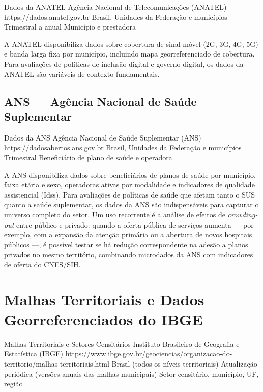 \ficharapida
  {Dados da ANATEL}
  {Agência Nacional de Telecomunicações (ANATEL)}
  {https://dados.anatel.gov.br}
  {Brasil, Unidades da Federação e municípios}
  {Trimestral a anual}
  {Município e prestadora}

A ANATEL disponibiliza dados sobre cobertura de sinal móvel (2G, 3G, 4G, 5G) e banda larga fixa por município, incluindo mapa georreferenciado de cobertura. Para avaliações de políticas de inclusão digital e governo digital, os dados da ANATEL são variáveis de contexto fundamentais.

\subsection{ANS --- Agência Nacional de Saúde Suplementar}

\ficharapida
  {Dados da ANS}
  {Agência Nacional de Saúde Suplementar (ANS)}
  {https://dadosabertos.ans.gov.br}
  {Brasil, Unidades da Federação e municípios}
  {Trimestral}
  {Beneficiário de plano de saúde e operadora}

A ANS disponibiliza dados sobre beneficiários de planos de saúde por município, faixa etária e sexo, operadoras ativas por modalidade e indicadores de qualidade assistencial (Idss). Para avaliações de políticas de saúde que afetam tanto o SUS quanto a saúde suplementar, os dados da ANS são indispensáveis para capturar o universo completo do setor. Um uso recorrente é a análise de efeitos de \textit{crowding-out} entre público e privado: quando a oferta pública de serviços aumenta --- por exemplo, com a expansão da atenção primária ou a abertura de novos hospitais públicos ---, é possível testar se há redução correspondente na adesão a planos privados no mesmo território, combinando microdados da ANS com indicadores de oferta do CNES/SIH.

\section{Malhas Territoriais e Dados Georreferenciados do IBGE}
\label{sec:malhas}

\ficharapida
  {Malhas Territoriais e Setores Censitários}
  {Instituto Brasileiro de Geografia e Estatística (IBGE)}
  {https://www.ibge.gov.br/geociencias/organizacao-do-territorio/malhas-territoriais.html}
  {Brasil (todos os níveis territoriais)}
  {Atualização periódica (versões anuais das malhas municipais)}
  {Setor censitário, município, UF, região}

